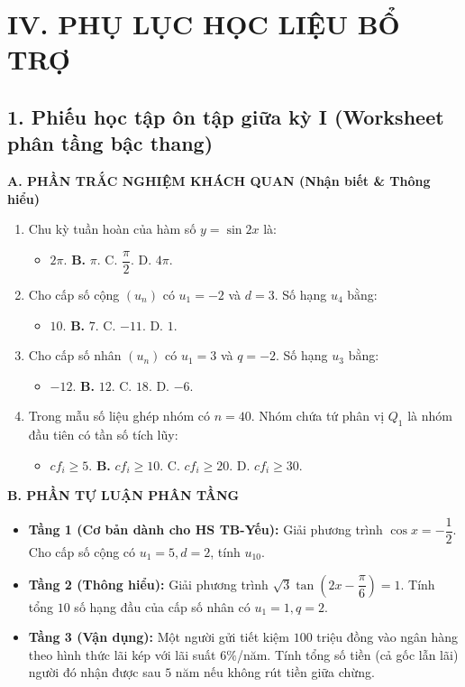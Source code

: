 \documentclass[12pt, a4paper]{article}
\begin{document}
\section*{IV. PHỤ LỤC HỌC LIỆU BỔ TRỢ}

\subsection*{1. Phiếu học tập ôn tập giữa kỳ I (Worksheet phân tầng bậc thang)}

\noindent \textbf{A. PHẦN TRẮC NGHIỆM KHÁCH QUAN (Nhận biết \& Thông hiểu)}
\begin{enumerate}[leftmargin=0.6cm]
    \item Chu kỳ tuần hoàn của hàm số $y = \sin 2x$ là:
    \begin{itemize}[leftmargin=0.6cm]
        \item[A.] $2\pi$. \quad \textbf{B.} $\pi$. \quad C. $\dfrac{\pi}{2}$. \quad D. $4\pi$.
    \end{itemize}
    \item Cho cấp số cộng $(u_n)$ có $u_1 = -2$ và $d = 3$. Số hạng $u_4$ bằng:
    \begin{itemize}[leftmargin=0.6cm]
        \item[A.] $10$. \quad \textbf{B.} $7$. \quad C. $-11$. \quad D. $1$.
    \end{itemize}
    \item Cho cấp số nhân $(u_n)$ có $u_1 = 3$ và $q = -2$. Số hạng $u_3$ bằng:
    \begin{itemize}[leftmargin=0.6cm]
        \item[A.] $-12$. \quad \textbf{B.} $12$. \quad C. $18$. \quad D. $-6$.
    \end{itemize}
    \item Trong mẫu số liệu ghép nhóm có $n = 40$. Nhóm chứa tứ phân vị $Q_1$ là nhóm đầu tiên có tần số tích lũy:
    \begin{itemize}[leftmargin=0.6cm]
        \item[A.] $cf_i \ge 5$. \quad \textbf{B.} $cf_i \ge 10$. \quad C. $cf_i \ge 20$. \quad D. $cf_i \ge 30$.
    \end{itemize}
\end{enumerate}

\noindent \textbf{B. PHẦN TỰ LUẬN PHÂN TẦNG}
\begin{itemize}[leftmargin=0.6cm]
    \item \textbf{Tầng 1 (Cơ bản dành cho HS TB-Yếu):} Giải phương trình $\cos x = -\dfrac{1}{2}$. Cho cấp số cộng có $u_1 = 5, d = 2$, tính $u_{10}$.
    \item \textbf{Tầng 2 (Thông hiểu):} Giải phương trình $\sqrt{3}\tan\left(2x - \dfrac{\pi}{6}\right) = 1$. Tính tổng $10$ số hạng đầu của cấp số nhân có $u_1 = 1, q = 2$.
    \item \textbf{Tầng 3 (Vận dụng):} Một người gửi tiết kiệm $100$ triệu đồng vào ngân hàng theo hình thức lãi kép với lãi suất $6\%$/năm. Tính tổng số tiền (cả gốc lẫn lãi) người đó nhận được sau $5$ năm nếu không rút tiền giữa chừng.
\end{itemize}
\end{document}
